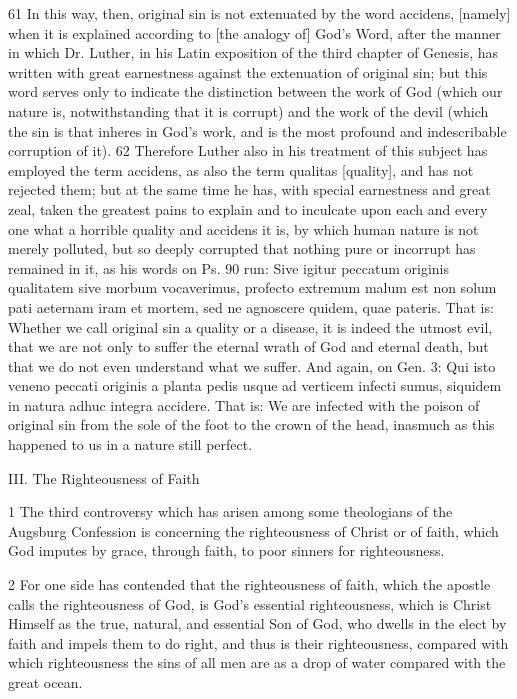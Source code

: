 61 In this way, then, original sin is not extenuated by the word accidens, [namely] when it is explained according to [the analogy of] God’s Word, after the manner in which Dr. Luther, in his Latin exposition of the third chapter of Genesis, has written with great earnestness against the extenuation of original sin; but this word serves only to indicate the distinction between the work of God (which our nature is, notwithstanding that it is corrupt) and the work of the devil (which the sin is that inheres in God’s work, and is the most profound and indescribable corruption of it).
62 Therefore Luther also in his treatment of this subject has employed the term accidens, as also the term qualitas [quality], and has not rejected them; but at the same time he has, with special earnestness and great zeal, taken the greatest pains to explain and to inculcate upon each and every one what a horrible quality and accidens it is, by which human nature is not merely polluted, but so deeply corrupted that nothing pure or incorrupt has remained in it, as his words on Ps. 90 run: Sive igitur peccatum originis qualitatem sive morbum vocaverimus, profecto extremum malum est non solum pati aeternam iram et mortem, sed ne agnoscere quidem, quae pateris. That is: Whether we call original sin a quality or a disease, it is indeed the utmost evil, that we are not only to suffer the eternal wrath of God and eternal death, but that we do not even understand what we suffer. And again, on Gen. 3: Qui isto veneno peccati originis a planta pedis usque ad verticem infecti sumus, siquidem in natura adhuc integra accidere. That is: We are infected with the poison of original sin from the sole of the foot to the crown of the head, inasmuch as this happened to us in a nature still perfect.

III. The Righteousness of Faith

1 The third controversy which has arisen among some theologians of the Augsburg Confession is concerning the righteousness of Christ or of faith, which God imputes by grace, through faith, to poor sinners for righteousness.

2 For one side has contended that the righteousness of faith, which the apostle calls the righteousness of God, is God’s essential righteousness, which is Christ Himself as the true, natural, and essential Son of God, who dwells in the elect by faith and impels them to do right, and thus is their righteousness, compared with which righteousness the sins of all men are as a drop of water compared with the great ocean.

